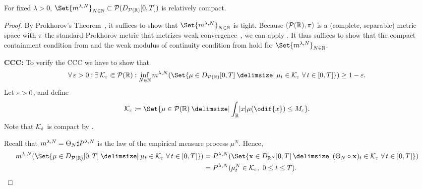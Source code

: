 \begin{theorem}
  For fixed \(\lambda > 0\), \(\Set{ \lawmu^{\lambda, N} }_{N\in\bN} \subset \cP(D_{\cP(\potspace)}[0,T])\) is relatively compact.
\end{theorem}

\begin{proof}
  By Prokhorov's Theorem~\cite[Theorem 5.1]{billingsleyConvergenceProbabilityMeasures1999}, it suffices to show that \(\Set{ \lawmu^{\lambda, N} }_{N\in\bN}\) is tight.
  Because \((\mathcal{P}(\mathbb{R}), \pi)\) is a (complete, separable) metric space with \( \pi \) the standard Prokhorov metric that metrizes weak convergence~\cite[Theorem 6.8]{billingsleyConvergenceProbabilityMeasures1999}, we can apply .
  It thus suffices to show that the compact containment condition from  and the weak modulus of continuity condition from  hold for \( \Set{ \lawmu^{\lambda, N} }_{N\in\bN} \).

  \textbf{CCC:}
  To verify the CCC we have to show that
  \begin{equation}
    \forall \eps > 0 : \exists \cK_\eps \Subset \cP(\potspace) :
    \inf_{N\in\bN} \lawmu^{\lambda, N} ( \Set{ \mu \in D_{\cP(\potspace)}[0,T] \given \mu_t \in \cK_\eps\ \forall t \in [0,T] } ) \geq 1 - \eps.
  \end{equation}
  Let \(\varepsilon > 0\), and define
  \begin{equation}
    \cK_\eps \coloneqq \Set{ \mu \in \cP(\potspace) \given \int_\potspace \abs{x} \mu(\odif{x}) \leq M_\eps }.
  \end{equation}
  Note that \( \mathcal{K}_\varepsilon \) is compact by .

  Recall that \(m^{\lambda, N} = \Theta_N \sharp P^{\lambda, N}\) is the law of the empirical measure process \(\mu^N\).
  Hence,
  \begin{equation}
    \begin{split}
      \lawmu^{\lambda, N} ( \Set{ \mu \in D_{\cP(\potspace)}[0,T] \given \mu_t \in \cK_\eps\ \forall t \in [0,T] } )
       & = P^{\lambda, N}( \Set{ \bm{x} \in D_{\potspace^N}[0,T] \given (\Theta_N \circ \bm{x})_t \in \cK_\eps\ \forall t \in [0,T] } ) \\
       & = P^{\lambda, N} (\mu_t^N \in \cK_\eps,\ 0 \leq t \leq T).
    \end{split}
  \end{equation}


\end{proof}
